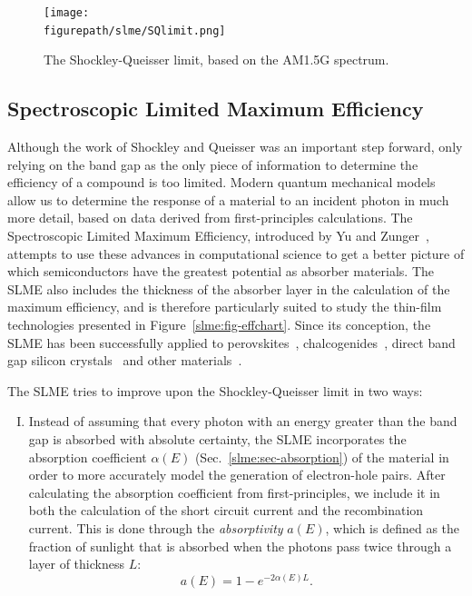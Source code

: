 \begin{refsection}
\begin{figure}[ht]  
\centering 
\texttt{[image: \\figurepath/slme/SQlimit.png]} 
\caption{\label{slme:fig-SQlimit} The Shockley-Queisser limit, based on the 
AM1.5G spectrum.} 
\end{figure} 

 
\subsection{Spectroscopic Limited Maximum Efficiency} \label{slme:sec-SLME} 
 
Although the work of Shockley and Queisser was an important step forward, only 
relying on the band gap as the only piece of information to determine the 
efficiency of a compound is too limited. Modern quantum mechanical models 
allow us to determine the response of a material to an incident photon in much 
more detail, based on data derived from first-principles calculations. The 
Spectroscopic Limited Maximum Efficiency, introduced by Yu and 
Zunger~\cite{Yu2012}, attempts to use these advances in computational science 
to get a better picture of which semiconductors have the greatest potential as 
absorber materials. The SLME also includes the thickness of the absorber layer 
in the calculation of the maximum efficiency, and is therefore particularly 
suited to study the thin-film technologies presented in 
Figure~\ref{slme:fig-effchart}. Since its conception, the SLME has been 
successfully applied to perovskites~\cite{Yin2014, Yin2015, Yin2015b, 
Meng2016}, chalcogenides~\cite{Hong2016, Sarmadian2016}, direct band gap 
silicon crystals~\cite{Lee2014, Oh2015} and other materials~\cite{Yu2012b, 
Yokoyama2013, Heo2014, Huang2015}.  

\pagebreak[4]
The SLME tries to improve upon the Shockley-Queisser limit in two ways:  
\vspace{0.1in} 
\begin{enumerate}[I.] 
 
\item Instead of assuming that every photon with an energy greater than the 
band gap is absorbed with absolute certainty, the SLME incorporates the 
absorption coefficient $\alpha(E)$ (Sec.~\ref{slme:sec-absorption}) of the 
material in order to more accurately model the generation of electron-hole 
pairs. After calculating the absorption coefficient from first-principles, we 
include it in both the calculation of the short circuit current and the 
recombination current. This is done through the \textit{absorptivity} $a(E)$, 
which is defined as the fraction of sunlight that is absorbed when the photons 
pass twice through a layer of thickness $L$: 
\begin{equation} \label{slme:eq-absorptivity} 
a(E) = 1 - e^{-2 \alpha(E) L}. 
\end{equation} 
 

\end{enumerate}
\end{refsection}
